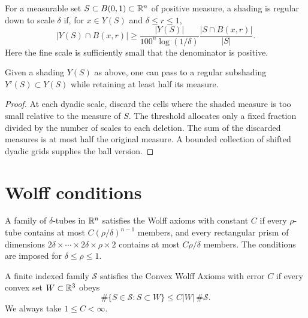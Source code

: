 \begin{definition}
\label{def:regular-shading}
For a measurable set $S\subset B(0,1)\subset\mathbb{R}^n$ of positive measure,
a shading is regular down to scale $\delta$ if, for $x\in Y(S)$ and
$\delta\leq r\leq1$,
\[
 |Y(S)\cap B(x,r)|\geq
 \frac{|Y(S)|}{100^n\log(1/\delta)}
 \frac{|S\cap B(x,r)|}{|S|}.
\]
Here the fine scale is sufficiently small that the denominator is
positive.
\end{definition}

\begin{lemma}
\label{lem:regular-shading}
Given a shading $Y(S)$ as above, one can pass to a regular subshading
$Y'(S)\subset Y(S)$ while retaining at least half its measure.
\end{lemma}
\begin{proof}
At each dyadic scale, discard the cells where the shaded measure is
too small relative to the measure of $S$. The threshold allocates only
a fixed fraction divided by the number of scales to each deletion.
The sum of the discarded measures is at most half the original measure.
A bounded collection of shifted dyadic grids supplies the ball version.
\end{proof}

\section{Wolff conditions}

\begin{definition}
\label{def:wolff}
A family of $\delta$-tubes in $\mathbb{R}^n$ satisfies the Wolff axioms with
constant $C$ if every $\rho$-tube contains at most
$C(\rho/\delta)^{n-1}$ members, and every rectangular prism of dimensions
$2\delta\times\cdots\times2\delta\times\rho\times2$ contains at most
$C\rho/\delta$ members. The conditions are imposed for
$\delta\leq\rho\leq1$.
\end{definition}

\begin{definition}
\label{def:cwa}
\leanok
A finite indexed family $\mathcal S$ satisfies the Convex Wolff Axioms
with error $C$ if every convex set $W\subset\mathbb{R}^3$ obeys
\[
  \#\{S\in\mathcal S:S\subset W\}\leq C|W|\,\#\mathcal S.
\]
We always take $1\leq C<\infty$.
\end{definition}

